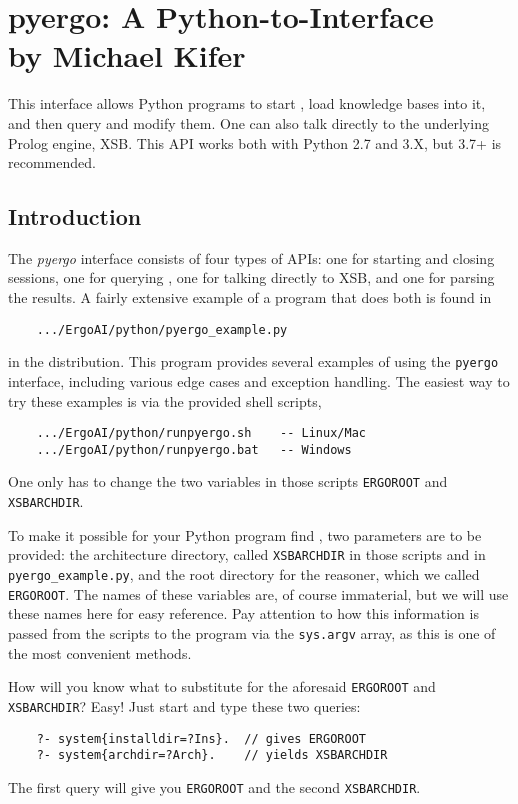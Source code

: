 \chapter[Python-to-\ERGO Interface]
{pyergo: A Python-to-\ERGO Interface \\ 
  {\Large by Michael Kifer}}

This interface allows Python programs to start \ERGO, load knowledge bases
into it, and then query and modify them.  One can also talk directly to the
underlying Prolog engine, XSB.
This API works both with Python 2.7 and 3.X, but 3.7+ is recommended.

\section{Introduction}

The \emph{pyergo} interface consists of four types of APIs: one for
starting and closing \ERGO sessions, one for querying \ERGO,
one for talking directly to XSB, and one for parsing the results.
A fairly extensive example of a program that does both is found in
\begin{verbatim}
    .../ErgoAI/python/pyergo_example.py
\end{verbatim}
in the \ERGO distribution. This program provides several examples of using
the \texttt{pyergo} interface, including various edge cases and exception
handling. 
The easiest way to try these examples is via the provided shell scripts,
\begin{verbatim}
    .../ErgoAI/python/runpyergo.sh    -- Linux/Mac
    .../ErgoAI/python/runpyergo.bat   -- Windows
\end{verbatim}
One only has to change the two variables in those scripts \texttt{ERGOROOT}
and \texttt{XSBARCHDIR}.

To make it possible for your Python program
find \ERGO, two parameters are to be provided: the architecture directory,
called \texttt{XSBARCHDIR} in those scripts and in
\texttt{pyergo\_example.py}, and the root directory for the \ERGO reasoner,
which we called \texttt{ERGOROOT}. The names of these variables are, of
course immaterial, but we will use these names here for easy reference.
Pay attention to how this information is passed from the scripts to the
program via the \texttt{sys.argv}  array, as this is one of the most
convenient methods.

How will you know what to substitute for the aforesaid \texttt{ERGOROOT}
and \texttt{XSBARCHDIR}? Easy! Just start \ERGO and type these two
queries:
\begin{verbatim}
    ?- system{installdir=?Ins}.  // gives ERGOROOT
    ?- system{archdir=?Arch}.    // yields XSBARCHDIR
\end{verbatim}
The first query will give you \texttt{ERGOROOT} and the second
\texttt{XSBARCHDIR}.

